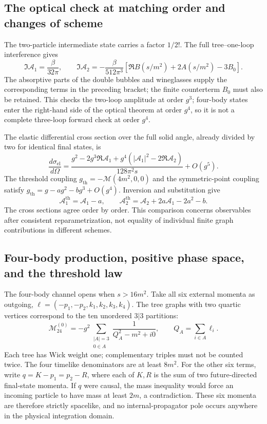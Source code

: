 \documentclass[11pt,a4paper,oneside]{article}
\theoremstyle{plain}
\theoremstyle{definition}
\theoremstyle{remark}
\numberwithin{equation}{section}
\begin{document}
\subsection{The optical check at matching order and changes of scheme}
The two-particle intermediate state carries a factor $1/2!$. The full tree--one-loop interference gives
\begin{equation}
 \Im\mathcal A_1=\frac{\beta}{32\pi},\qquad
 \Im\mathcal A_2=-\frac{\beta}{512\pi^3}
 [\Re B(s/m^2)+2A(s/m^2)-3B_0].
\end{equation}
The absorptive parts of the double bubbles and wineglasses supply the corresponding terms in the preceding bracket; the finite counterterm $B_0$ must also be retained. This checks the two-loop amplitude at order $g^3$; four-body states enter the right-hand side of the optical theorem at order $g^4$, so it is not a complete three-loop forward check at order $g^4$.

The elastic differential cross section over the full solid angle, already divided by two for identical final states, is
\begin{equation}
 \frac{d\sigma_{\mathrm{el}}}{d\Omega}
 =\frac{g^2-2g^3\Re\mathcal A_1+
 g^4(|\mathcal A_1|^2-2\Re\mathcal A_2)}{128\pi^2s}+O(g^5).
\end{equation}
The threshold coupling $g_{\mathrm{th}}=-\mathcal M(4m^2,0,0)$ and the symmetric-point coupling satisfy $g_{\mathrm{th}}=g-ag^2-bg^3+O(g^4)$. Inversion and substitution give
\begin{equation}
 \mathcal A_1^{\mathrm{th}}=\mathcal A_1-a,\qquad
 \mathcal A_2^{\mathrm{th}}=\mathcal A_2+2a\mathcal A_1-2a^2-b.
\end{equation}
The cross sections agree order by order. This comparison concerns observables after consistent reparametrization, not equality of individual finite graph contributions in different schemes.


\subsection{Four-body production, positive phase space, and the threshold law}
The four-body channel opens when $s>16m^2$. Take all six external momenta as outgoing, $\ell=(-p_1,-p_2,k_1,k_2,k_3,k_4)$. The tree graphs with two quartic vertices correspond to the ten unordered $3|3$ partitions:
\begin{equation}
 \mathcal M_{24}^{(0)}=-g^2\sum_{\substack{|A|=3\\0\in A}}
 \frac1{Q_A^2-m^2+i0},\qquad Q_A=\sum_{i\in A}\ell_i.
\end{equation}
Each tree has Wick weight one; complementary triples must not be counted twice. The four timelike denominators are at least $8m^2$. For the other six terms, write $q=K-p_1=p_2-R$, where each of $K,R$ is the sum of two future-directed final-state momenta. If $q$ were causal, the mass inequality would force an incoming particle to have mass at least $2m$, a contradiction. These six momenta are therefore strictly spacelike, and no internal-propagator pole occurs anywhere in the physical integration domain.
\end{document}
